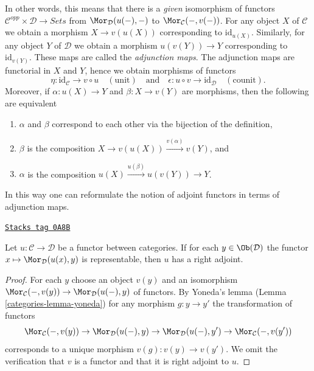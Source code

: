 In other words, this means that there is a {\it given} isomorphism of functors
$\mathcal{C}^{opp} \times \mathcal{D} \to \textit{Sets}$ from
$\Mor_\mathcal{D}(u(-), -)$ to $\Mor_\mathcal{C}(-, v(-))$. For any object
$X$ of $\mathcal{C}$ we obtain a morphism $X \to v(u(X))$ corresponding to
$\text{id}_{u(X)}$. Similarly, for any object $Y$ of $\mathcal{D}$ we obtain
a morphism $u(v(Y)) \to Y$ corresponding to $\text{id}_{v(Y)}$.
These maps are called the {\it adjunction maps}. The adjunction maps
are functorial in $X$ and $Y$, hence we obtain morphisms of functors
$$
\eta : \text{id}_\mathcal{C} \to v \circ u\quad (\text{unit})
\quad\text{and}\quad
\epsilon : u \circ v \to \text{id}_\mathcal{D}\quad (\text{counit}).
$$
Moreover, if $\alpha : u(X) \to Y$
and $\beta : X \to v(Y)$ are morphisms, then the following are equivalent
\begin{enumerate}
\item $\alpha$ and $\beta$ correspond to each other via the
bijection of the definition,
\item $\beta$ is the composition $X \to v(u(X)) \xrightarrow{v(\alpha)} v(Y)$,
and
\item $\alpha$ is the composition $u(X) \xrightarrow{u(\beta)} u(v(Y)) \to Y$.
\end{enumerate}
In this way one can reformulate the notion of adjoint functors in terms
of adjunction maps.

\begin{lemma}
\label{categories-lemma-adjoint-exists}
\href{https://stacks.math.columbia.edu/tag/0A8B}{\texttt{Stacks tag 0A8B}}

Let $u : \mathcal{C} \to \mathcal{D}$ be a functor between categories.
If for each $y \in \Ob(\mathcal{D})$ the functor
$x \mapsto \Mor_\mathcal{D}(u(x), y)$ is representable, then
$u$ has a right adjoint.
\end{lemma}

\begin{proof}

For each $y$ choose an object $v(y)$ and an isomorphism
$\Mor_\mathcal{C}(-, v(y)) \to \Mor_\mathcal{D}(u(-), y)$
of functors. By Yoneda's lemma (Lemma \ref{categories-lemma-yoneda})
for any morphism $g : y \to y'$ the transformation of functors
$$
\Mor_\mathcal{C}(-, v(y)) \to \Mor_\mathcal{D}(u(-), y) \to
\Mor_\mathcal{D}(u(-), y') \to \Mor_\mathcal{C}(-, v(y'))
$$
corresponds to a unique morphism $v(g) : v(y) \to v(y')$.
We omit the verification that $v$ is a functor and that
it is right adjoint to $u$.
\end{proof}


